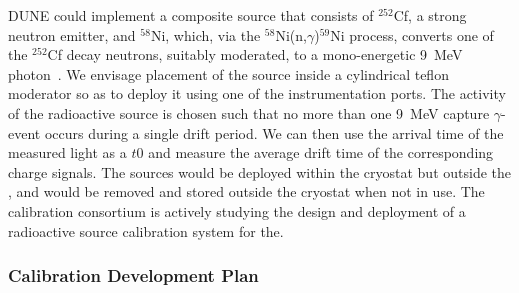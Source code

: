 DUNE could implement a composite source that consists of $^{252}$Cf, a strong neutron emitter, and $^{58}$Ni, which, via the $^{58}$Ni(n,$\gamma$)$^{59}$Ni process, converts one of the $^{252}$Cf decay neutrons, suitably moderated, to a mono-energetic \SI{9}{MeV} photon~\cite{Rogers:1996ks}. We envisage placement of the source inside a cylindrical teflon moderator so as to deploy it using one of the instrumentation ports. The activity of the radioactive source is chosen such that no more than one \SI{9}{\MeV} capture $\gamma$-event occurs during a single drift period. We can then use the arrival time of the measured light as a $t0$ and measure the average drift time of the corresponding charge signals. The sources would be deployed  within the cryostat but outside the , and would be removed and stored outside the cryostat when not in use. The calibration consortium is actively studying  the design and deployment of a radioactive source calibration system for the. 

\subsubsection{Calibration Development Plan}
\label{sec:phys-calib-devplan}

